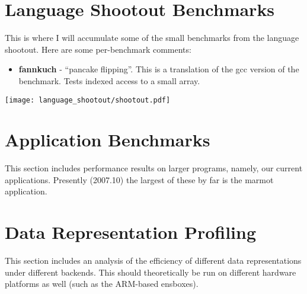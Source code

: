 \documentclass{article}
\begin{document}
\section{Language Shootout Benchmarks}

This is where I will accumulate some of the small benchmarks from the
language shootout.  Here are some per-benchmark comments:

\begin{itemize}
\item {\bf fannkuch} - ``pancake flipping''.  This is a translation of the
  gcc version of the benchmark.  Tests indexed access to a small array.
\end{itemize}

\begin{center}
\texttt{[image: language\_shootout/shootout.pdf]}
\end{center}



\section{Application Benchmarks}

This section includes performance results on larger programs, namely, our
current applications.  Presently (2007.10) the largest of these by far
is the marmot application.

\section{Data Representation Profiling}

This section includes an analysis of the efficiency of different data
representations under different backends.  This should theoretically
be run on different hardware platforms as well (such as the ARM-based ensboxes).
\end{document}
